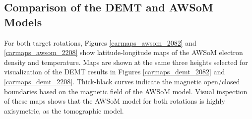 \documentclass[namedreferences]{solarphysics}
\begin{document}
\begin{article}
\subsection{{Comparison of the DEMT and AWSoM Models}}\label{awsom_res} 

{For both target rotations,} Figures \ref{carmaps_awsom_2082} and \ref{carmaps_awsom_2208} show latitude-longitude maps of the AWSoM electron density and temperature. {Maps are shown} at the same three heights selected for visualization of the DEMT results in Figures \ref{carmaps_demt_2082} and \ref{carmaps_demt_2208}. {Thick-black curves} indicate the magnetic open/closed boundaries based on the magnetic field of the AWSoM model. Visual inspection of these maps shows that the AWSoM model for both rotations is highly {axisymetric}, as the tomographic model.


\end{article}
\end{document}
